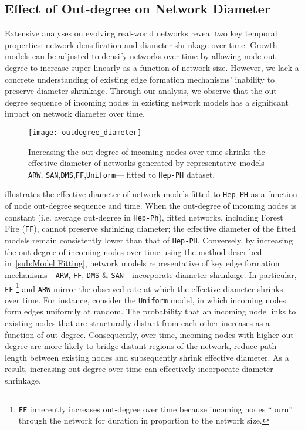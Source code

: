 \subsection{Effect of Out-degree on Network Diameter}
Extensive analyses \cite{hu2009evolution,mcglohon2011statistical} on evolving
real-world networks reveal two key temporal properties: network densification and diameter
shrinkage over time. Growth models can be adjusted to densify networks over time
by allowing node out-degree to increase super-linearly as a
function of network size. However, we lack a concrete understanding of existing
edge formation mechanisms' inability to preserve diameter shrinkage. Through our
analysis, we observe that the out-degree sequence of incoming nodes in existing
network models has a significant impact on network diameter over time.
\begin{figure}[H]
 \vspace{-10pt}
 \centering
 \texttt{[image: outdegree\_diameter]}
 \caption{
    Increasing the out-degree of incoming nodes over time shrinks the effective
    diameter of networks generated by representative models---\texttt{ARW},
    \texttt{SAN},\texttt{DMS},\texttt{FF},\texttt{Uniform}--- fitted to \texttt{Hep-PH} dataset.
 }
 \label{fig:diameter}
 \vspace{-10pt}
\end{figure}

 illustrates the effective diameter of network models fitted
to \texttt{Hep-PH} as a function of node out-degree sequence and time. When
the out-degree of incoming nodes is constant (i.e. average out-degree in
\texttt{Hep-Ph}), fitted networks, including Forest Fire (\texttt{FF}), cannot preserve
shrinking diameter; the effective diameter of the fitted models remain
consistently lower than that of \texttt{Hep-PH}. Conversely, by increasing the
out-degree of incoming nodes over time using the method described
in~\cref{sub:Model Fitting}, network models representative of key edge formation
mechanisms---\texttt{ARW}, \texttt{FF}, \texttt{DMS} \&
\texttt{SAN}---incorporate diameter shrinkage. In particular,
\texttt{FF} \footnote{\texttt{FF} inherently increases out-degree over time
because incoming nodes ``burn'' through the network for duration in proportion
to the network size.} and \texttt{ARW} mirror the observed rate at which the
effective diameter shrinks over time.
For instance, consider the \texttt{Uniform} model, in which incoming nodes form
edges uniformly at random. The probability that an incoming node links to
existing nodes that are structurally distant from each other increases as a
function of out-degree. Consequently, over time, incoming nodes with higher
out-degree are more likely to bridge distant regions of the network, reduce path
length between existing nodes and subsequently shrink effective diameter.
As a result, increasing out-degree over time can effectively incorporate diameter
shrinkage.

